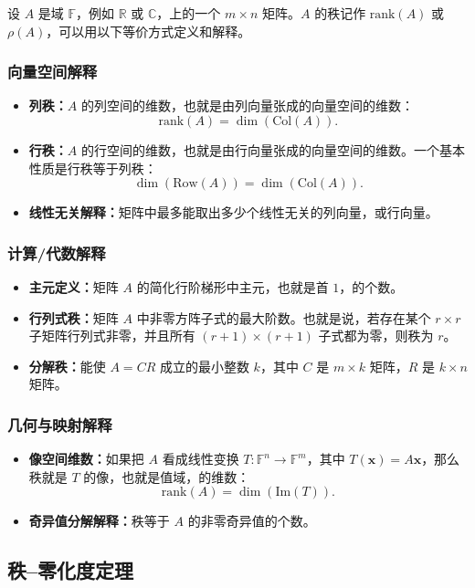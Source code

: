 设 $A$ 是域 $\mathbb{F}$，例如 $\mathbb{R}$ 或 $\mathbb{C}$，上的一个 $m\times n$ 矩阵。$A$ 的秩记作 $\text{rank}(A)$ 或 $\rho(A)$，可以用以下等价方式定义和解释。

\subsubsection{向量空间解释}
\begin{itemize}
    \item \textbf{列秩：}$A$ 的列空间的维数，也就是由列向量张成的向量空间的维数：
    \[ \text{rank}(A)=\dim(\text{Col}(A)). \]
    \item \textbf{行秩：}$A$ 的行空间的维数，也就是由行向量张成的向量空间的维数。一个基本性质是行秩等于列秩：
    \[ \dim(\text{Row}(A))=\dim(\text{Col}(A)). \]
    \item \textbf{线性无关解释：}矩阵中最多能取出多少个线性无关的列向量，或行向量。
\end{itemize}

\subsubsection{计算/代数解释}
\begin{itemize}
    \item \textbf{主元定义：}矩阵 $A$ 的简化行阶梯形中主元，也就是首 $1$，的个数。
    \item \textbf{行列式秩：}矩阵 $A$ 中非零方阵子式的最大阶数。也就是说，若存在某个 $r\times r$ 子矩阵行列式非零，并且所有 $(r+1)\times(r+1)$ 子式都为零，则秩为 $r$。
    \item \textbf{分解秩：}能使 $A=CR$ 成立的最小整数 $k$，其中 $C$ 是 $m\times k$ 矩阵，$R$ 是 $k\times n$ 矩阵。
\end{itemize}

\subsubsection{几何与映射解释}
\begin{itemize}
    \item \textbf{像空间维数：}如果把 $A$ 看成线性变换 $T:\mathbb{F}^n\to\mathbb{F}^m$，其中 $T(\mathbf{x})=A\mathbf{x}$，那么秩就是 $T$ 的像，也就是值域，的维数：
    \[ \text{rank}(A)=\dim(\text{Im}(T)). \]
    \item \textbf{奇异值分解解释：}秩等于 $A$ 的非零奇异值的个数。
\end{itemize}

\subsection{秩--零化度定理}

